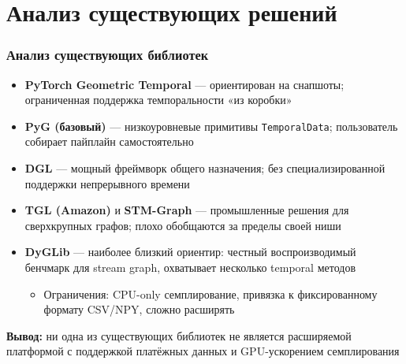\documentclass[aspectratio=169]{beamer}
\begin{document}
\section{Анализ существующих решений}
\begin{frame}
  \frametitle{Анализ существующих библиотек}
  \begin{itemize}
    \item \textbf{PyTorch Geometric Temporal} — ориентирован на снапшоты; ограниченная поддержка темпоральности «из коробки»
    \item \textbf{PyG (базовый)} — низкоуровневые примитивы \texttt{TemporalData}; пользователь собирает пайплайн самостоятельно
    \item \textbf{DGL} — мощный фреймворк общего назначения; без специализированной поддержки непрерывного времени
    \item \textbf{TGL (Amazon)} и \textbf{STM-Graph} — промышленные решения для сверхкрупных графов; плохо обобщаются за пределы своей ниши
    \item \textbf{DyGLib} — наиболее близкий ориентир: честный воспроизводимый бенчмарк для stream graph, охватывает несколько temporal методов
      \begin{itemize}
        \item Ограничения: CPU-only семплирование, привязка к фиксированному формату CSV/NPY, сложно расширять
      \end{itemize}
  \end{itemize}
  \vspace{0.2cm}
  \textbf{Вывод:} ни одна из существующих библиотек не является расширяемой платформой с поддержкой платёжных данных и GPU-ускорением семплирования
\end{frame}

\end{document}
